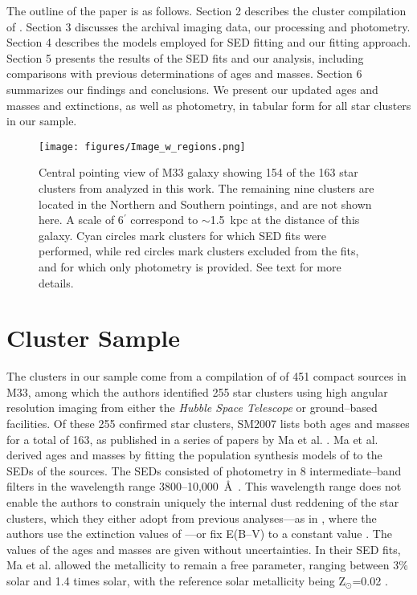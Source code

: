 \documentclass{aastex63}
\begin{document}
The outline of the paper is as follows. Section 2 describes the cluster compilation of \citet{Sarajedini2007}. Section 3 discusses the archival imaging data, our processing and photometry. Section 4 describes the models employed for SED fitting and our fitting approach. Section 5 presents the results of the SED fits and our analysis, including comparisons with previous determinations of  ages and masses. Section 6 summarizes our findings and conclusions. We present our updated ages and masses and extinctions, as well as photometry, in tabular form for all star  clusters in our sample. 
  
\begin{figure}
 \centering
 \texttt{[image: figures/Image\_w\_regions.png]}
    \caption{Central pointing view of M33 galaxy \citep[U band, from][]{Massey+2006} showing 154 of the 163 star clusters from \citet{Sarajedini2007} analyzed in this work. The remaining nine clusters are located in the Northern and Southern pointings, and are not shown here. A scale of 6$^{\prime}$ correspond to $\sim$1.5~kpc  at the distance of this galaxy. Cyan circles mark clusters for which SED fits were performed, while red circles mark  clusters excluded from the  fits, and for which only photometry is provided. See text for more details.}
        \label{regions}
\end{figure}


\section{Cluster Sample} \label{sec:identification}

The clusters in our sample come from a compilation of \citet[][(henceforth SM2007)]{Sarajedini2007} of 451 compact sources in M33, among which the authors identified 255 star clusters using high angular resolution imaging from either the \textit{Hubble Space Telescope} or ground--based facilities. Of these 255 confirmed star clusters, SM2007 lists both ages and masses for a total of 163, as published in a series of papers by Ma et al. \citep{Ma+2001, Ma+2002b, Ma+2002c, Ma+2002a,   Ma+2004a, Ma+2004b}. Ma et al. derived ages and masses by fitting the population synthesis models of \citet[][with the 1996 improvements]{BruzualCharlot1993} to the SEDs of the sources. The SEDs consisted of photometry in 8 intermediate--band filters in the wavelength range 3800--10,000~\r{A}\  \citep{Ma+2001}. This wavelength range does not enable the authors to constrain uniquely the internal dust reddening of the star clusters, which they either adopt from previous analyses---as in \citet{Ma+2001}, where the authors use the extinction values of \citet{Chandar+1999}---or fix E(B--V) to a constant value \citep[E(B--V)=0.1,][]{Ma+2002b}. The values of the ages and masses are given without uncertainties. In their SED fits, Ma et al. allowed  the metallicity to remain a free parameter, ranging between 3\% solar and 1.4 times solar, with the reference solar metallicity being Z$_{\odot}$=0.02 \citep{Iglesias+1992}.
\end{document}
